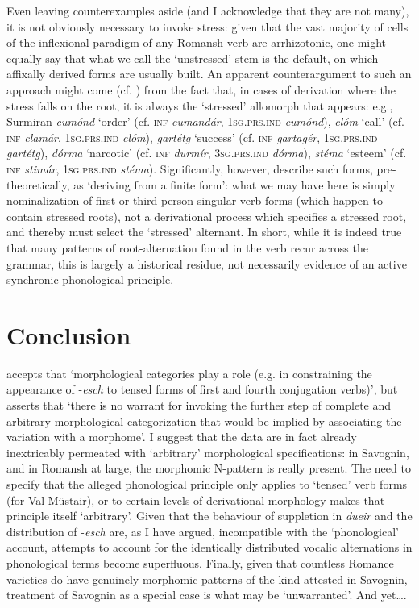 \documentclass[output=paper,
modfonts
]{LSP/langsci}
\begin{document}
Even leaving counterexamples aside (and I acknowledge that they are not
many), it is not obviously necessary to invoke stress: given that the
vast majority of cells of the inflexional paradigm of any Romansh verb
are arrhizotonic, one might equally say that what we call the
`unstressed' stem is the default, on which affixally derived forms are
usually built. An apparent counterargument to such an approach might
come (cf. \citealt[17]{anderson2013stem}) from the fact that, in cases of derivation
where the stress falls on the root, it is always the `stressed'
allomorph that appears: e.g., Surmiran \emph{cumónd} `order' (cf.
\textsc{inf} \emph{cumandár}, \textsc{1sg.prs.ind} \emph{cumónd}),
\emph{clóm} `call' (cf. \textsc{inf} \emph{clamár}, \textsc{1sg.prs.ind}
\emph{clóm}), \emph{gartétg} `success' (cf. \textsc{inf}
\emph{gartagér}, \textsc{1sg.prs.ind} \emph{gartétg}), \emph{dórma}
`narcotic' (cf. \textsc{inf} \emph{durmír}, \textsc{3sg.prs.ind}
\emph{dórma}), \emph{stéma} `esteem' (cf. \textsc{inf} \emph{stimár},
\textsc{1sg.prs.ind} \emph{stéma}). Significantly, however, \citet[51]{signorell1987a} describe such forms, pre-theoretically, as `deriving from
a finite form': what we may have here is simply nominalization of first
or third person singular verb-forms (which happen to contain stressed
roots), not a derivational process which specifies a stressed root, and
thereby must select the `stressed' alternant. In short, while it is
indeed true that many patterns of root-alternation found in the verb
recur across the grammar, this is largely a historical residue, not
necessarily evidence of an active synchronic phonological principle.

\section{Conclusion}\label{conclusion}

\citet[23]{anderson2013stem} accepts that `morphological categories play a role
(e.g. in constraining the appearance of -\emph{esch} to tensed forms of
first and fourth conjugation verbs)', but asserts that `there is no
warrant for invoking the further step of complete and arbitrary
morphological categorization that would be implied by associating the
variation with a morphome'. I suggest that the data are in fact already
inextricably permeated with `arbitrary' morphological specifications: in
Savognin, and in Romansh at large, the morphomic N-pattern is really
present. The need to specify that the alleged phonological principle
only applies to `tensed' verb forms (for Val Müstair), or to certain
levels of derivational morphology makes that principle itself
`arbitrary'. Given that the behaviour of suppletion in \emph{dueir} and
the distribution of -\emph{esch} are, as I have argued, incompatible
with the `phonological' account, attempts to account for the identically
distributed vocalic alternations in phonological terms become
superfluous. Finally, given that countless Romance varieties do have
genuinely morphomic patterns of the kind attested in Savognin, treatment
of Savognin as a special case is what may be `unwarranted'. And
yet\ldots{}.
\end{document}
